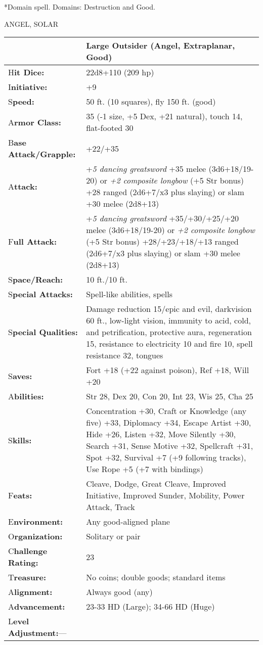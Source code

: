 \documentclass{article}
\begin{document}
*Domain spell. Domains: Destruction and Good.

\vspace{12pt}
ANGEL, SOLAR

\begin{tabular}{|>{\raggedright}p{90pt}|>{\raggedright}p{236pt}|}
\hline
  & Large Outsider (Angel, Extraplanar, Good)\tabularnewline
\hline
H\textbf{it Dice:} & 22d8+110 (209 hp)\tabularnewline
\hline
I\textbf{nitiative:} & +9\tabularnewline
\hline
S\textbf{peed:} & 50 ft. (10 squares), fly 150 ft. (good)\tabularnewline
\hline
A\textbf{rmor Class:} & 35 (-1 size, +5 Dex, +21 natural), touch 14, flat-footed 
30\tabularnewline
\hline
B\textbf{ase Attack/Grapple:} & +22/+35\tabularnewline
\hline
A\textbf{ttack:} & +\textit{5 dancing greatsword }+35 melee (3d6+18/19-20) or \textit{+2 
composite longbow }(+5 Str bonus) +28 ranged (2d6+7/x3 plus slaying) or slam +30 
melee (2d8+13)\tabularnewline
\hline
F\textbf{ull Attack:} & +\textit{5 dancing greatsword }+35/+30/+25/+20 melee (3d6+18/19-20) 
or \textit{+2 composite longbow }(+5 Str bonus) +28/+23/+18/+13 ranged (2d6+7/x3 
plus slaying) or slam +30 melee (2d8+13)\tabularnewline
\hline
S\textbf{pace/Reach:} & 10 ft./10 ft.\tabularnewline
\hline
S\textbf{pecial Attacks:} & Spell-like abilities, spells\tabularnewline
\hline
S\textbf{pecial Qualities:} & Damage reduction 15/epic and evil, darkvision 60 
ft., low-light vision, immunity to acid, cold, and petrification, protective aura, 
regeneration 15, resistance to electricity 10 and fire 10, spell resistance 32, 
tongues\tabularnewline
\hline
S\textbf{aves:} & Fort +18 (+22 against poison), Ref +18, Will +20\tabularnewline
\hline
A\textbf{bilities:} & Str 28, Dex 20, Con 20, Int 23, Wis 25, Cha 25\tabularnewline
\hline
S\textbf{kills:} & Concentration +30, Craft or Knowledge (any five) +33, Diplomacy 
+34, Escape Artist +30, Hide +26, Listen +32, Move Silently +30, Search +31, Sense 
Motive +32, Spellcraft +31, Spot +32, Survival +7 (+9 following tracks), Use Rope 
+5 (+7 with bindings)\tabularnewline
\hline
F\textbf{eats:} & Cleave, Dodge, Great Cleave, Improved Initiative, Improved Sunder, 
Mobility, Power Attack, Track\tabularnewline
\hline
E\textbf{nvironment:} & Any good-aligned plane\tabularnewline
\hline
O\textbf{rganization:} & Solitary or pair\tabularnewline
\hline
C\textbf{hallenge Rating:} & 23\tabularnewline
\hline
T\textbf{reasure:} & No coins; double goods; standard items\tabularnewline
\hline
A\textbf{lignment:} & Always good (any)\tabularnewline
\hline
A\textbf{dvancement:} & 23-33 HD (Large); 34-66 HD (Huge)\tabularnewline
\hline
L\textbf{evel Adjustment:}--- & \tabularnewline
\hline
\end{tabular}
\end{document}
